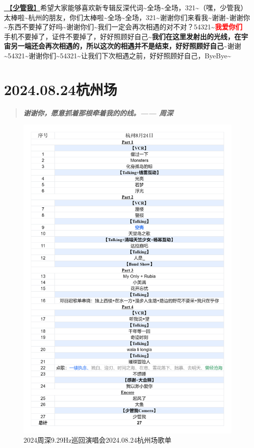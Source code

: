 \documentclass[]{ctexbook}
\begin{document}
\hyperref[watch-ur-manners]{🎵【\textbf{少管我}】}希望大家能够喜欢新专辑反深代词\textasciitilde 全场\textasciitilde 全场，321\textasciitilde（嘿，少管我）太棒啦\textasciitilde 杭州的朋友，你们太棒啦\textasciitilde 全场\textasciitilde 全场，321\textasciitilde 谢谢你们来看我\textasciitilde 谢谢\textasciitilde 谢谢你\textasciitilde 东西不要掉了好吗\textasciitilde 谢谢你们\textasciitilde 我们一定会再次相遇的对不对？54321\textasciitilde{}\textbf{\textcolor{red}{我爱你们~} } 手机不要掉了，证件不要掉了，好好照顾好自己\textasciitilde{}\textbf{我们在这里发射出的光线，在宇宙另一端还会再次相遇的，所以这次的相遇并不是结束，好好照顾好自己\textasciitilde{}}谢谢\textasciitilde54321\textasciitilde 谢谢你们\textasciitilde54321\textasciitilde 让我们下次相遇之前，好好照顾好自己，ByeBye\textasciitilde{}

\chapter{2024.08.24杭州场}\label{hangzhou-20240824}

\begin{quote}
\textbf{\emph{谢谢你，愿意抓着那根牵着我的的线。------ 周深}}
\end{quote}

\begin{figure}

{\centering \includegraphics[width=320pt]{img/playlists/playlists-hangzhou-20240824} 

}

\caption{2024周深9.29Hz巡回演唱会2024.08.24杭州场歌单}\label{fig:unnamed-chunk-71}
\end{figure}
\end{document}
